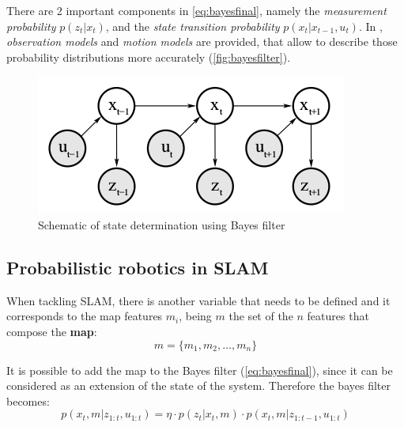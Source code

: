 There are 2 important components in \autoref{eq:bayesfinal}, namely the \emph{measurement probability} $p(z_t|x_t)$, and the \emph{state transition probability} $p(x_t|x_{t-1},u_t)$. In , \emph{observation models} and \emph{motion models} are provided, that allow to describe those probability distributions more accurately (\autoref{fig:bayesfilter}).
\begin{figure}[htb]
  \centering
  \includegraphics[width=\linewidth]{pictures/03/bayesfilter}
  \caption{Schematic of state determination using Bayes filter}
  \label{fig:bayesfilter}
\end{figure}

\subsection{Probabilistic robotics in SLAM}

When tackling SLAM, there is another variable that needs to be defined and it corresponds to the map features $m_i$, being $m$ the set of the $n$ features that compose the \textbf{map}:
\begin{equation}
  m = \{m_1,m_2,\ldots,m_n\}
  \label{eq:mapvar}
\end{equation}  

It is possible to add the map to the Bayes filter (\autoref{eq:bayesfinal}), since it can be considered as an extension of the state of the system. Therefore the bayes filter becomes:
\begin{equation}
  p(x_t,m|z_{1:t},u_{1:t}) = \eta\cdot p(z_t|x_t,m)\cdot p(x_t,m|z_{1:t-1},u_{1:t})
  \label{eq:bayesslam}  
\end{equation} 

